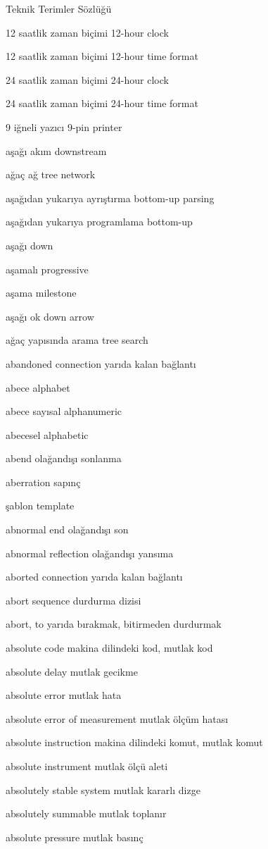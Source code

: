 \documentclass[12pt,fleqn]{article}\usepackage{../../common}
\begin{document}
Teknik Terimler Sözlüğü

12 saatlik zaman biçimi 12-hour clock

12 saatlik zaman biçimi 12-hour time format

24 saatlik zaman biçimi 24-hour clock

24 saatlik zaman biçimi 24-hour time format

9 iğneli yazıcı 9-pin printer

aşağı akım downstream

ağaç ağ tree network

aşağıdan yukarıya ayrıştırma bottom-up parsing

aşağıdan yukarıya programlama bottom-up

aşağı down

aşamalı progressive

aşama milestone

aşağı ok down arrow

ağaç yapısında arama tree search

abandoned connection yarıda kalan bağlantı

abece alphabet

abece sayısal alphanumeric

abecesel alphabetic

abend olağandışı sonlanma

aberration sapınç

şablon template

abnormal end olağandışı son

abnormal reflection olağandışı yansıma

aborted connection yarıda kalan bağlantı

abort sequence durdurma dizisi

abort, to yarıda bırakmak, bitirmeden durdurmak

absolute code makina dilindeki kod, mutlak kod

absolute delay mutlak gecikme

absolute error mutlak hata

absolute error of measurement mutlak ölçüm hatası

absolute instruction makina dilindeki komut, mutlak komut

absolute instrument mutlak ölçü aleti

absolutely stable system mutlak kararlı dizge

absolutely summable mutlak toplanır

absolute pressure mutlak basınç
\end{document}
